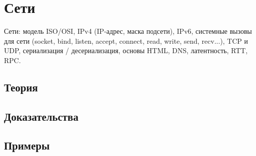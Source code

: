 
\section{Сети}
\label{sec:2.3b.08-networking}

\begin{ticket}
Сети: модель ISO/OSI, IPv4 (IP-адрес, маска подсети), IPv6, системные вызовы для сети (socket, bind, listen, accept, connect, read, write, send, recv...), TCP и UDP, сериализация / десериализация, основы HTML, DNS, латентность, RTT, RPC.
\end{ticket}

\subsection*{Теория}

\subsection*{Доказательства}

\subsection*{Примеры}
